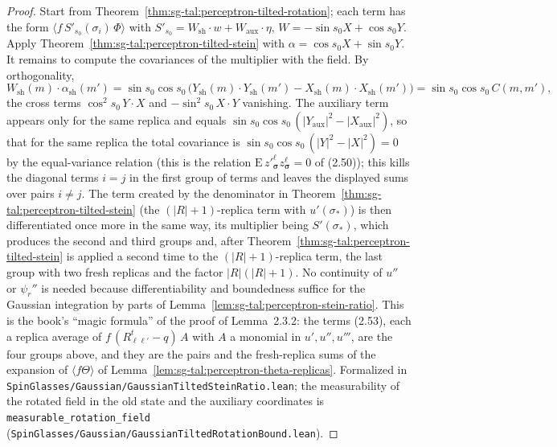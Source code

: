 \begin{proof}
  \leanok
Start from Theorem~\ref{thm:sg-tal:perceptron-tilted-rotation}; each term has the form $\langle f\,S'_{s_0}(\sigma_i)\,\Phi\rangle$ with $S'_{s_0}=W_{\mathrm{sh}}\cdot w+W_{\mathrm{aux}}\cdot\eta$, $W=-\sin s_0X+\cos s_0Y$. Apply Theorem~\ref{thm:sg-tal:perceptron-tilted-stein} with
$\alpha=\cos s_0X+\sin s_0Y$. It remains to compute the covariances of the multiplier with the field. By orthogonality,
\[
 W_{\mathrm{sh}}(m)\cdot\alpha_{\mathrm{sh}}(m')=\sin s_0\cos s_0\,\bigl(Y_{\mathrm{sh}}(m)\cdot Y_{\mathrm{sh}}(m')-X_{\mathrm{sh}}(m)\cdot X_{\mathrm{sh}}(m')\bigr)=\sin s_0\cos s_0\,C(m,m'),
\]
the cross terms $\cos^2s_0\,Y\cdot X$ and $-\sin^2s_0\,X\cdot Y$ vanishing. The auxiliary term appears only for the same replica and equals $\sin s_0\cos s_0\,(|Y_{\mathrm{aux}}|^2-|X_{\mathrm{aux}}|^2)$, so that for the same replica the total covariance is $\sin s_0\cos s_0\,(|Y|^2-|X|^2)=0$ by the equal-variance relation (this is the relation $\mathrm E\,z'^{\ell}_{\boldsymbol\sigma}z^{\ell}_{\boldsymbol\sigma}=0$ of (2.50)); this kills the diagonal terms $i=j$ in the first group of terms and leaves the displayed sums over pairs $i\ne j$.
The term created by the denominator in Theorem~\ref{thm:sg-tal:perceptron-tilted-stein} (the $(|R|+1)$-replica term with $u'(\sigma_*)$) is then differentiated once more in the same way, its multiplier being $S'(\sigma_*)$, which produces the second and third groups and, after Theorem~\ref{thm:sg-tal:perceptron-tilted-stein} is applied a second time to the $(|R|+1)$-replica term, the last group with two fresh replicas and the factor $|R|(|R|+1)$.
No continuity of $u''$ or $\psi_r''$ is needed because differentiability and boundedness suffice for the Gaussian integration by parts of Lemma~\ref{lem:sg-tal:perceptron-stein-ratio}. This is the book's ``magic formula'' of the proof of Lemma~2.3.2: the terms (2.53), each a replica average of $f\,(R^t_{\ell\ell'}-q)\,A$ with $A$ a monomial in $u',u'',u'''$, are the four groups above, and they are the pairs and the fresh-replica sums of the expansion of $\langle f\Theta\rangle$ of Lemma~\ref{lem:sg-tal:perceptron-theta-replicas}.
Formalized in \texttt{SpinGlasses/Gaussian/GaussianTiltedSteinRatio.lean}; the measurability of the rotated field in the old state and the auxiliary coordinates is \texttt{measurable\_rotation\_field} (\texttt{SpinGlasses/Gaussian/GaussianTiltedRotationBound.lean}).
\end{proof}

